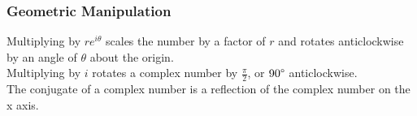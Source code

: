 \documentclass[../main]{subfiles}
\begin{document}
	\subsubsection{Geometric Manipulation}
	Multiplying by \(re^{i\theta}\) scales the number by a factor of \(r\) and rotates anticlockwise by an angle of \(\theta\) about the origin. \\
	Multiplying by \(i\) rotates a complex number by \(\frac{\pi}{2}\), or \(90\degree\) anticlockwise. \\
	The conjugate of a complex number is a reflection of the complex number on the x axis.
\end{document}
